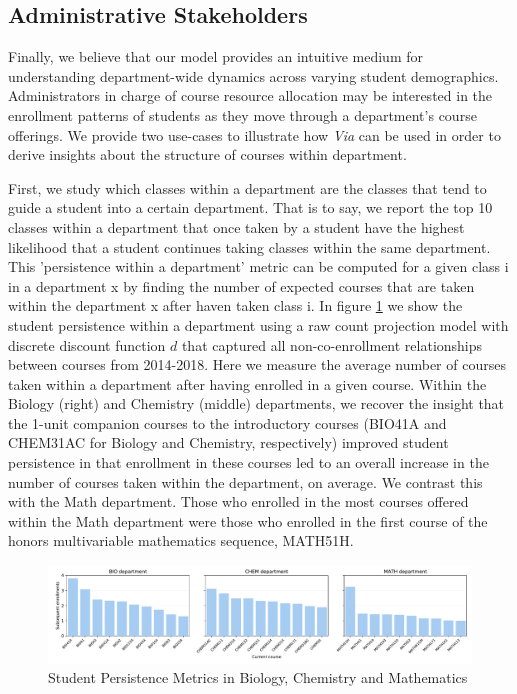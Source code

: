 \documentclass{sigchi}
\begin{document}
\subsection{Administrative Stakeholders}
\label{sec:administrative_stakeholders}

Finally, we believe that our model provides an intuitive medium for understanding department-wide dynamics across varying student demographics. Administrators in charge of course resource allocation may be interested in the enrollment patterns of students as they move through a department's course offerings. We provide two use-cases to illustrate how \textit{Via} can be used in order to derive insights about the structure of courses within department.

First, we study which classes within a department are the classes that tend to guide a student into a certain department. That is to say, we report the top 10 classes within a department that once taken by a student have the highest likelihood that a student continues taking classes within the same department. This 'persistence within a department' metric can be computed for a given class i in a department x by finding the number of expected courses that are taken within the department x after haven taken class i. In figure \ref{fig:persistence} we show the student persistence within a department using a raw count projection model with discrete discount function $d$ that captured all non-co-enrollment relationships between courses from 2014-2018. Here we measure the average number of courses taken within a department after having enrolled in a given course. Within the Biology (right) and Chemistry (middle) departments, we recover the insight that the 1-unit companion courses to the introductory courses (BIO41A and CHEM31AC for Biology and Chemistry, respectively) improved student persistence in that enrollment in these courses led to an overall increase in the number of courses taken within the department, on average. We contrast this with the Math department. Those who enrolled in the most courses offered within the Math department were those who enrolled in the first course of the honors multivariable mathematics sequence, MATH51H. 

\begin{figure}[h!]
    \centering
    \includegraphics[width=18cm]{final-persistence.pdf}
    \caption{Student Persistence Metrics in Biology, Chemistry and Mathematics}
    \label{fig:persistence}
\end{figure}
\end{document}
